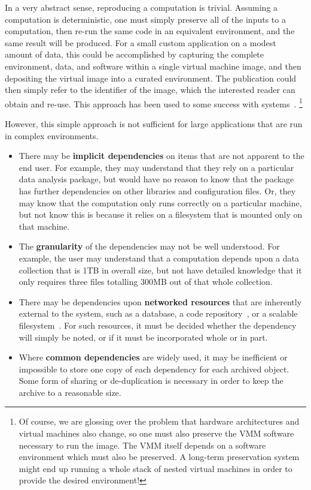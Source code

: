 In a very abstract sense, reproducing a computation is trivial.
Assuming a computation is deterministic, one must simply
preserve all of the inputs to a computation, then re-run
the same code in an equivalent environment, and the same result
will be produced.  For a small custom application on a modest
amount of data, this could be accomplished by capturing the
complete environment,
data, and software within a single virtual machine image,
and then depositing the virtual
image into a curated environment.  The publication could
then simply refer to the identifier of the image, which the
interested reader can obtain and re-use. This approach has
been used to some success with systems~\cite{castagne2013consider}.
\footnote{Of course, we are glossing over the problem that hardware
architectures and virtual machines also change, so one must also
preserve the VMM software necessary to run the image.  The VMM itself
depends on a software environment which must also be preserved.
A long-term preservation system might end up running a whole
stack of nested virtual machines in order to provide the desired
environment! }

However, this simple approach is not sufficient for large applications
that are run in complex environments.

\begin{itemize}
\item There may be {\bf implicit dependencies} on items that are
not apparent to the end user.  For example, they may understand that
they rely on a particular data analysis package, but would have
no reason to know that the package has further dependencies on
other libraries and configuration files.  Or, they may know that
the computation only runs correctly on a particular machine, but
not know this is because it relies on a filesystem that
is mounted only on that machine.

\item The {\bf granularity} of the dependencies may not be well understood.
For example, the user may understand that a computation depends upon
a data collection that is 1TB in overall size, but not have detailed
knowledge that it only requires three files totalling 300MB out of that
whole collection.

\item There may be dependencies upon {\bf networked resources} that
are inherently external to the system, such as a database, a code
repository~\cite{cms2006cmssw}, or a scalable filesystem~\cite{blomer2011cernvm}.  For such resources, it
must be decided whether the dependency will simply be noted, or if it
must be incorporated whole or in part.

\item Where {\bf common dependencies} are widely used, it may be inefficient or
impossible to store one copy of each dependency for each archived object.
Some form of sharing or de-duplication is necessary in order to keep
the archive to a reasonable size.
\end{itemize}

